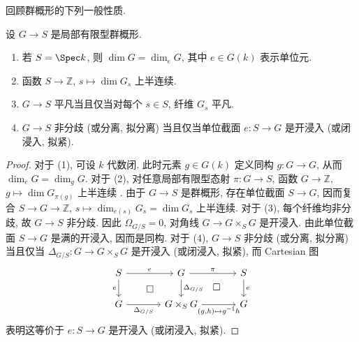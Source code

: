 回顾群概形的下列一般性质.
\begin{proposition}\label{src:B.1.9}
设 $G\to S$ 是局部有限型群概形.
\begin{enumerate}[(1)]
\item 若 $S=\Spec k$, 则 $\dim G=\dim_eG$, 其中 $e\in G(k)$ 表示单位元.
\item 函数 $S\to\mathbb Z$, $s\mapsto\dim G_s$ 上半连续.
\item $G\to S$ 平凡当且仅当对每个 $s\in S$, 纤维 $G_s$ 平凡.
\item $G\to S$ 非分歧 (或分离, 拟分离) 当且仅当单位截面 $e:S\to G$ 是开浸入 (或闭浸入, 拟紧).
\end{enumerate}
\end{proposition}
\begin{proof}
对于 (1), 可设 $k$ 代数闭. 此时元素 $g\in G(k)$ 定义同构 $g:G\to G$, 从而 $\dim_eG=\dim_gG$. 对于 (2), 对任意局部有限型态射 $\pi:G\to S$, 函数 $G\to\mathbb Z$, $g\mapsto\dim G_{\pi(g)}$ 上半连续 \cite[IV.$13.1.3$]{EGA}. 由于 $G\to S$ 是群概形, 存在单位截面 $S\to G$, 因而复合 $S\to G\to\mathbb Z$, $s\mapsto\dim_{e(s)}G_s=\dim G_s$ 上半连续. 对于 (3), 每个纤维均非分歧, 故 $G\to S$ 非分歧. 因此 $\Omega_{G/S}=0$, 对角线 $G\to G\times_S G$ 是开浸入. 由此单位截面 $S\to G$ 是满的开浸入, 因而是同构. 对于 (4), $G\to S$ 非分歧 (或分离, 拟分离) 当且仅当 $\Delta_{G/S}:G\to G\times_S G$ 是开浸入 (或闭浸入, 拟紧), 而 Cartesian 图
\[
\begin{tikzcd}[column sep=3.5em]
S\arrow[r,"e"]\arrow[d,"e"']&G\arrow[r,"\pi"]\arrow[d,"\Delta_{G/S}"]&S\arrow[d,"e"]\\
G\arrow[r,"\Delta_{G/S}"']\arrow[ur,phantom,"\square" description]&G\times_S G\arrow[r,"{(g,h)\mapsto g^{-1}h}"']\arrow[ur,phantom,"\square" description]&G
\end{tikzcd}
\]
表明这等价于 $e:S\to G$ 是开浸入 (或闭浸入, 拟紧).
\end{proof}

